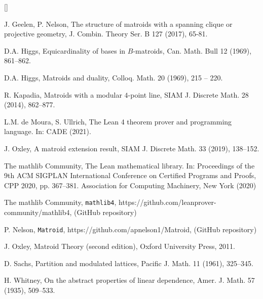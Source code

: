 \documentclass{amsart}
\theoremstyle{plain}
\theoremstyle{definition}
\newcommand{\smalltt}[1]{{\small\texttt{#1}}}
\begin{document}
\begin{list}{[]}
\item\label{gn}
J. Geelen, P. Nelson,
The structure of matroids with a spanning clique or projective geometry,
J. Combin. Theory Ser. B 127 (2017), 65-81.

\item\label{higgs69}
D.A. Higgs, 
Equicardinality of bases in $B$-matroids, 
Can. Math. Bull 12 (1969), 861--862. 

\item\label{higgs}
D.A. Higgs,
Matroids and duality,
Colloq. Math. 20 (1969), 215 -- 220. 

\item\label{k14}
R. Kapadia,
Matroids with a modular $4$-point line, 
SIAM J. Discrete Math. 28 (2014), 862--877. 

\item\label{lean4}
L.M. de Moura, S. Ullrich, 
The Lean 4 theorem prover and programming language. 
In: CADE (2021).

\item\label{o19}
J. Oxley, 
A matroid extension result,
SIAM J. Discrete Math. 33 (2019), 138--152. 

\item\label{mathlibpaper}
The mathlib Community,
The Lean mathematical library. In: Proceedings of the
9th ACM SIGPLAN International Conference on Certified Programs and Proofs,
CPP 2020, pp. 367–381. Association for Computing Machinery, New York (2020)

\item\label{mathlib}
The mathlib Community,
\smalltt{mathlib4},
https://github.com/leanprover-community/mathlib4,
(GitHub repository)

\item\label{matroidrepo}
P. Nelson,
\smalltt{Matroid},
https://github.com/apnelson1/Matroid,
(GitHub repository)

\item\label{oxley}
J. Oxley, 
Matroid Theory (second edition), 
Oxford University Press, 2011. 

\item\label{sachs}
D. Sachs,
Partition and modulated lattices,
Pacific J. Math. 11 (1961), 325--345.

\item\label{whitney}
H. Whitney, 
On the abstract properties of linear dependence,
Amer. J. Math. 57 (1935), 509--533. 

\end{list}

\newpage
\end{document}
